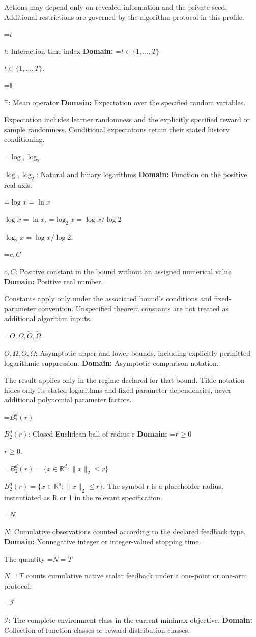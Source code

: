 \documentclass[10pt,a4paper]{article}
\newcommand{\AtlasMath}[1]{\par\begingroup\centering\setbox0=\hbox{$\displaystyle #1$}\ifdim\wd0>1.4\linewidth\typeout{ATLAS WIDE FORMULA: \the\wd0}\fi\ifdim\wd0>\linewidth\resizebox{\linewidth}{!}{\box0}\else\box0\fi\par\endgroup}
\newcommand{\AtlasInlineMath}[1]{\begingroup\setbox0=\hbox{$#1$}\ifdim\wd0>.4\linewidth\endgroup\AtlasMath{#1}\else\endgroup$#1$\fi}
\begin{document}
Actions may depend only on revealed information and the private seed. Additional restrictions are governed by the algorithm protocol in this profile.

\AtlasInlineMath{t}: Interaction-time index \textbf{Domain:} \AtlasInlineMath{t\in\{1,\ldots,T\}}.

\AtlasInlineMath{\mathbb E}: Mean operator \textbf{Domain:} Expectation over the specified random variables.

Expectation includes learner randomness and the explicitly specified reward or sample randomness. Conditional expectations retain their stated history conditioning.

\AtlasInlineMath{\log,\log_2}: Natural and binary logarithms \textbf{Domain:} Function on the positive real axis.

\AtlasInlineMath{\log x=\ln x}, \AtlasInlineMath{\log_2x=\log x/\log2}.

\AtlasInlineMath{c,C}: Positive constant in the bound without an assigned numerical value \textbf{Domain:} Positive real number.

Constants apply only under the associated bound’s conditions and fixed-parameter convention. Unspecified theorem constants are not treated as additional algorithm inputs.

\AtlasInlineMath{O,\Omega,\widetilde O,\widetilde\Omega}: Asymptotic upper and lower bounds, including explicitly permitted logarithmic suppression. \textbf{Domain:} Asymptotic comparison notation.

The result applies only in the regime declared for that bound. Tilde notation hides only its stated logarithms and fixed-parameter dependencies, never additional polynomial parameter factors.

\AtlasInlineMath{B_2^d(r)}: Closed Euclidean ball of radius r \textbf{Domain:} \AtlasInlineMath{r\ge0}.

\AtlasInlineMath{B_2^d(r)=\{x\in\mathbb R^d:\|x\|_2\le r\}}. The symbol r is a placeholder radius, instantiated as R or 1 in the relevant specification.

\AtlasInlineMath{N}: Cumulative observations counted according to the declared feedback type. \textbf{Domain:} Nonnegative integer or integer-valued stopping time.

The quantity \AtlasInlineMath{N=T} counts cumulative native scalar feedback under a one-point or one-arm protocol.

\AtlasInlineMath{\mathcal I}: The complete environment class in the current minimax objective. \textbf{Domain:} Collection of function classes or reward-distribution classes.
\end{document}
